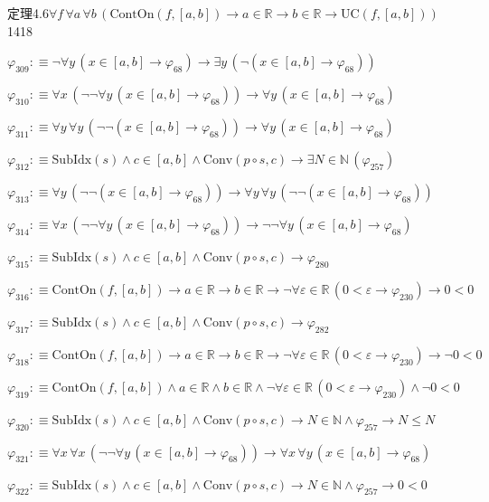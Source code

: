 \begin{fullproof}{定理4.6}{$\forall f\,\forall a\,\forall b\,(\mathrm{ContOn}(f,[a,b]) \to a \in \mathbb{R} \to b \in \mathbb{R} \to \mathrm{UC}(f,[a,b]))$}{1418}
\begin{abbrevlist}
\item $\varphi_{309} :\equiv \neg \forall y\,(x \in [a,b] \to \varphi_{68}) \to \exists y\,(\neg (x \in [a,b] \to \varphi_{68}))$
\item $\varphi_{310} :\equiv \forall x\,(\neg \neg \forall y\,(x \in [a,b] \to \varphi_{68})) \to \forall y\,(x \in [a,b] \to \varphi_{68})$
\item $\varphi_{311} :\equiv \forall y\,\forall y\,(\neg \neg (x \in [a,b] \to \varphi_{68})) \to \forall y\,(x \in [a,b] \to \varphi_{68})$
\item $\varphi_{312} :\equiv \mathrm{SubIdx}(s) \land c \in [a,b] \land \mathrm{Conv}(p \circ s,c) \to \exists N \in \mathbb{N}\,(\varphi_{257})$
\item $\varphi_{313} :\equiv \forall y\,(\neg \neg (x \in [a,b] \to \varphi_{68})) \to \forall y\,\forall y\,(\neg \neg (x \in [a,b] \to \varphi_{68}))$
\item $\varphi_{314} :\equiv \forall x\,(\neg \neg \forall y\,(x \in [a,b] \to \varphi_{68})) \to \neg \neg \forall y\,(x \in [a,b] \to \varphi_{68})$
\item $\varphi_{315} :\equiv \mathrm{SubIdx}(s) \land c \in [a,b] \land \mathrm{Conv}(p \circ s,c) \to \varphi_{280}$
\item $\varphi_{316} :\equiv \mathrm{ContOn}(f,[a,b]) \to a \in \mathbb{R} \to b \in \mathbb{R} \to \neg \forall \varepsilon \in \mathbb{R}\,(0 < \varepsilon \to \varphi_{230}) \to 0 < 0$
\item $\varphi_{317} :\equiv \mathrm{SubIdx}(s) \land c \in [a,b] \land \mathrm{Conv}(p \circ s,c) \to \varphi_{282}$
\item $\varphi_{318} :\equiv \mathrm{ContOn}(f,[a,b]) \to a \in \mathbb{R} \to b \in \mathbb{R} \to \neg \forall \varepsilon \in \mathbb{R}\,(0 < \varepsilon \to \varphi_{230}) \to \neg 0 < 0$
\item $\varphi_{319} :\equiv \mathrm{ContOn}(f,[a,b]) \land a \in \mathbb{R} \land b \in \mathbb{R} \land \neg \forall \varepsilon \in \mathbb{R}\,(0 < \varepsilon \to \varphi_{230}) \land \neg 0 < 0$
\item $\varphi_{320} :\equiv \mathrm{SubIdx}(s) \land c \in [a,b] \land \mathrm{Conv}(p \circ s,c) \to N \in \mathbb{N} \land \varphi_{257} \to N \leq N$
\item $\varphi_{321} :\equiv \forall x\,\forall x\,(\neg \neg \forall y\,(x \in [a,b] \to \varphi_{68})) \to \forall x\,\forall y\,(x \in [a,b] \to \varphi_{68})$
\item $\varphi_{322} :\equiv \mathrm{SubIdx}(s) \land c \in [a,b] \land \mathrm{Conv}(p \circ s,c) \to N \in \mathbb{N} \land \varphi_{257} \to 0 < 0$

\end{abbrevlist}
\end{fullproof}
